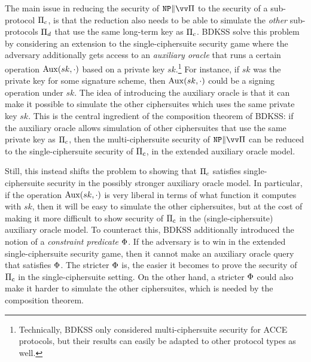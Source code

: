 The main issue in reducing the security of $\multiprotocol$ to the security of a sub-protocol $\mathrm{\Pi}_c$,
is that the reduction also needs to be able to simulate the \emph{other} sub-protocols $\mathrm{\Pi}_d$ that use the same long-term key as $\mathrm{\Pi}_c$.
BDKSS solve this problem by considering an extension to the single-ciphersuite security game where the adversary additionally gets access to an \emph{auxiliary oracle} that runs a certain operation $\mathrm{Aux}(sk, \cdot)$ based on a private key $sk$.\footnote{Technically,
BDKSS only considered multi-ciphersuite security for ACCE protocols,
but their results can easily be adapted to other protocol types as well.
}
For instance,
if $sk$ was the private key for some signature scheme,
then $\mathrm{Aux}(sk, \cdot)$ could be a signing operation under $sk$.  
The idea of introducing the auxiliary oracle is that it can make it possible to simulate the other ciphersuites which uses the same private key $sk$.
This is the central ingredient of the composition theorem of BDKSS:
if the auxiliary oracle allows simulation of other ciphersuites that use the same private key as $\mathrm{\Pi}_c$,
then the multi-ciphersuite security of $\multiprotocol$ can be reduced to the single-ciphersuite security of $\mathrm{\Pi}_c$,
in the extended auxiliary oracle model.

Still,
this instead shifts the problem to showing that $\mathrm{\Pi}_c$ satisfies single-ciphersuite security in the possibly stronger auxiliary oracle model.
In particular,
if the operation $\mathrm{Aux}(sk, \cdot)$ is very liberal in terms of what function it computes with $sk$,
then it will be easy to simulate the other ciphersuites,
but at the cost of making it more difficult to show security of $\mathrm{\Pi}_c$ in the (single-ciphersuite) auxiliary oracle model.
To counteract this,
BDKSS additionally introduced the notion of a \emph{constraint predicate} $\Phi$.
If the adversary is to win in the extended single-ciphersuite security game,
then it cannot make an auxiliary oracle query that satisfies $\Phi$.
The stricter $\Phi$ is,
the easier it becomes to prove the security of $\mathrm{\Pi}_c$ in the single-ciphersuite setting.
On the other hand,
a stricter $\Phi$ could also make it harder to simulate the other ciphersuites,
which is needed by the composition theorem.

